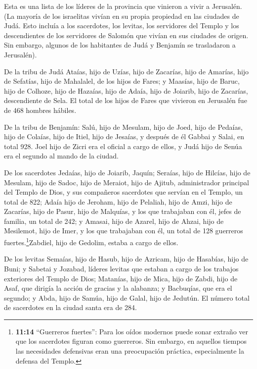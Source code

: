  Esta es una lista de los líderes de la provincia que
vinieron a vivir a Jerusalén. (La mayoría de los israelitas vivían en su
propia propiedad en las ciudades de Judá. Esto incluía a los sacerdotes,
los levitas, los servidores del Templo y los descendientes de los
servidores de Salomón que vivían en sus ciudades de origen. 
Sin embargo, algunos de los habitantes de Judá y Benjamín se trasladaron
a Jerusalén).

De la tribu de Judá Ataías, hijo de Uzías, hijo de Zacarías, hijo de
Amarías, hijo de Sefatías, hijo de Mahalalel, de los hijos de Fares;
 y Maasías, hijo de Baruc, hijo de Colhoze, hijo de Hazaías,
hijo de Adaía, hijo de Joiarib, hijo de Zacarías, descendiente de Sela.
 El total de los hijos de Fares que vivieron en Jerusalén
fue de 468 hombres hábiles.

 De la tribu de Benjamín: Salú, hijo de Mesulam, hijo de
Joed, hijo de Pedaías, hijo de Colaías, hijo de Itiel, hijo de Jesaías,
 y después de él Gabbai y Salai, en total 928. 
Joel hijo de Zicri era el oficial a cargo de ellos, y Judá hijo de Senúa
era el segundo al mando de la ciudad.

 De los sacerdotes Jedaías, hijo de Joiarib, Jaquín;
 Seraías, hijo de Hilcías, hijo de Mesulam, hijo de Sadoc,
hijo de Meraiot, hijo de Ajitub, administrador principal del Templo de
Dios,  y sus compañeros sacerdotes que servían en el
Templo, un total de 822; Adaía hijo de Jeroham, hijo de Pelaliah, hijo
de Amzi, hijo de Zacarías, hijo de Pasur, hijo de Malquías,
 y los que trabajaban con él, jefes de familia, un total de
242; y Amasai, hijo de Azarel, hijo de Ahzai, hijo de Mesilemot, hijo de
Imer,  y los que trabajaban con él, un total de 128
guerreros fuertes.\footnote{\textbf{11:14} ``Guerreros fuertes'': Para
  los oídos modernos puede sonar extraño ver que los sacerdotes figuran
  como guerreros. Sin embargo, en aquellos tiempos las necesidades
  defensivas eran una preocupación práctica, especialmente la defensa
  del Templo.}Zabdiel, hijo de Gedolim, estaba a cargo de ellos.

 De los levitas Semaías, hijo de Hasub, hijo de Azricam,
hijo de Hasabías, hijo de Buni;  y Sabetai y Jozabad,
líderes levitas que estaban a cargo de los trabajos exteriores del
Templo de Dios;  Matanías, hijo de Mica, hijo de Zabdi,
hijo de Asaf, que dirigía la acción de gracias y la alabanza; y
Bacbuqías, que era el segundo; y Abda, hijo de Samúa, hijo de Galal,
hijo de Jedutún.  El número total de sacerdotes en la
ciudad santa era de 284.

